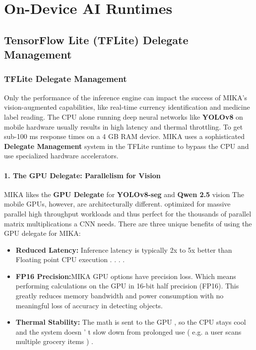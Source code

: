\documentclass[12pt,a4paper]{report}
\begin{document}
\section{On-Device AI Runtimes}
 
\subsection{TensorFlow Lite (TFLite) Delegate Management}
\subsubsection{TFLite Delegate Management}
 
Only the performance of the inference engine can impact the success of MIKA’s vision-augmented capabilities, like real-time currency identification and medicine label reading. The CPU alone running deep neural networks like \textbf{YOLOv8} on mobile hardware usually results in high latency and thermal throttling. To get sub-100 ms response times on a 4 GB RAM device. MIKA uses a sophisticated \textbf{Delegate Management} system in the TFLite runtime to bypass the CPU and use specialized hardware accelerators.

\paragraph{1. The GPU Delegate: Parallelism for Vision}
MIKA likes the \textbf{GPU Delegate} for \textbf{YOLOv8-seg} and \textbf{Qwen 2.5} vision The mobile GPUs, however, are architecturally different. optimized for massive parallel high throughput workloads and thus perfect for the thousands of parallel matrix multiplications a CNN needs.
There are three unique benefits of using the GPU delegate for MIKA:
\begin{itemize}
    \item \textbf{Reduced Latency:} Inference latency is typically 2x to 5x better than Floating point CPU execution . . . . 
    \item \textbf{FP16 Precision:}MIKA GPU options have precision loss. Which means performing calculations on the GPU in 16-bit half precision (FP16). This greatly reduces memory bandwidth and power consumption with no meaningful loss of accuracy in detecting objects.
    \item \textbf{Thermal Stability:} The math is sent to the GPU , so the CPU stays cool and the system doesn ' t slow down from prolonged use ( e.g. a user scans multiple grocery items ) .
\end{itemize}
 
\end{document}

